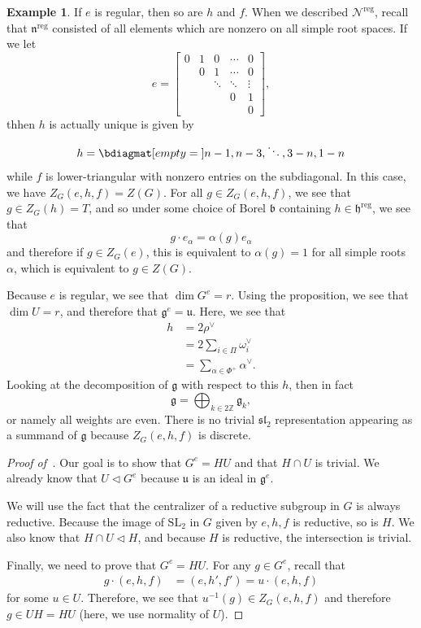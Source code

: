 \documentclass{amsart}
\theoremstyle{definition}
\newtheorem{exm}[thm]{Example}
\theoremstyle{remark}
\theoremstyle{plain}
\theoremstyle{definition}
\theoremstyle{remark}
\newcommand{\Z}{\mathbb{Z}}
\newcommand{\g}{\mathfrak{g}}
\newcommand{\h}{\mathfrak{h}}
\newcommand{\n}{\mathfrak{n}}
\renewcommand{\b}{\mathfrak{b}}
\newcommand{\mc}[1]{\mathcal{#1}}
\newcommand{\mf}[1]{\mathfrak{#1}}
\newcommand{\mr}[1]{\mathrm{#1}}
\newcommand{\on}[1]{\operatorname{#1}}
\newcommand{\1}{\mathbf{1}}
\newcommand{\2}{\mathbf{2}}
\newcommand{\3}{\mathbf{3}}
\newcommand{\SL}{\mr{SL}}
\renewcommand{\sl}{\mf{sl}}
\begin{document}
\begin{exm}
    If \(e\) is regular, then so are \(h\) and \(f\). When we described \(\mc{N}^{\on{reg}}\), recall that \(\n^{\on{reg}}\) consisted of all elements which are nonzero on all simple root spaces. If we let
    \[ e = \begin{bmatrix}
        0 & 1 & 0 & \cdots & 0 \\
        & 0 & 1 & \cdots & 0 \\
        &  & \ddots & \ddots & \vdots \\
        &  &  & 0 & 1 \\
        &  &  &  & 0
    \end{bmatrix}, \]
    thhen \(h\) is actually unique is given by
    \[ h = \bdiagmat[empty={}]{n-1, n-3, \ddots, 3-n, 1-n} \]
    while \(f\) is lower-triangular with nonzero entries on the subdiagonal. In this case, we have \(Z_G(e,h,f) = Z(G)\). For all \(g \in Z_G(e,h,f)\), we see that \(g \in Z_G(h) = T\), and so under some choice of Borel \(\b\) containing \(h \in \h^{\on{reg}}\), we see that
    \[ g \cdot e_{\alpha} = \alpha(g) e_{\alpha} \]
    and therefore if \(g \in Z_G(e)\), this is equivalent to \(\alpha(g) = 1\) for all simple roots \(\alpha\), which is equivalent to \(g \in Z(G)\).
\end{exm}

Because \(e\) is regular, we see that \(\dim G^e = r\). Using the proposition, we see that \(\dim U = r\), and therefore that \(\g^e = \mf{u}\). Here, we see that
\begin{align*}
    h &= 2 \rho^{\vee} \\
    &= 2 \sum_{i \in \Pi} \omega_i^{\vee} \\
    &= \sum_{\alpha \in \Phi^+} \alpha^{\vee}.
\end{align*}
Looking at the decomposition of \(\g\) with respect to this \(h\), then in fact
\[ \g = \bigoplus_{k \in 2\Z} \g_k, \]
or namely all weights are even. There is no trivial \(\sl_2\) representation appearing as a summand of \(\g\) because \(Z_G(e,h,f)\) is discrete.

\begin{proof}[Proof of~]
    Our goal is to show that \(G^e = HU\) and that \(H \cap U\) is trivial. We already know that \(U \triangleleft G^e\) because \(\mf{u}\) is an ideal in \(\g^e\).
    
    We will use the fact that the centralizer of a reductive subgroup in \(G\) is always reductive. Because the image of \(\SL_2\) in \(G\) given by \(e,h,f\) is reductive, so is \(H\). We also know that \(H \cap U \triangleleft H\), and because \(H\) is reductive, the intersection is trivial.

    Finally, we need to prove that \(G^e = HU\). For any \(g \in G^e\), recall that
    \begin{align*}
        g \cdot (e,h,f) &= (e, h', f') = u \cdot (e,h,f)
    \end{align*}
    for some \(u \in U\). Therefore, we see that \(u^{-1}(g) \in Z_G(e,h,f)\) and therefore \(g \in UH = HU\) (here, we use normality of \(U\)).
\end{proof}
\end{document}
